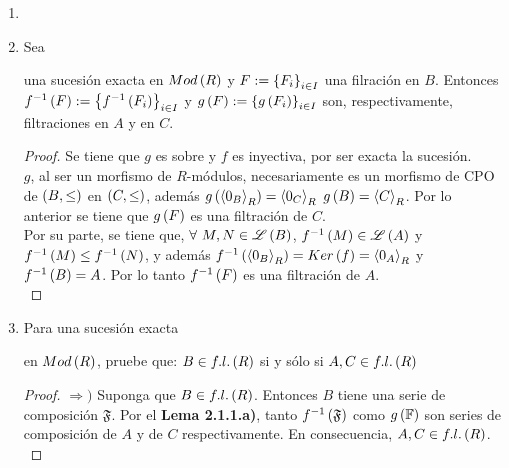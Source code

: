 \documentclass{article}
\begin{document}
\begin{enumerate}[label=\textbf{Ej \arabic*.}]
\begin{proof}
	$\boxed{\text{(b)}}$ Para este inciso suponga que $M$ es un $R$-módulo simple. En consecuencia, $L(M)=\{0,M\}$. Con lo cual, $M$ tiene una serie de composición $0=M_{0} \leq M_{1}=M$. De modo que $l\lrprth{M}=1$. Por otro lado, suponga que $l\lrprth{M}=1$, y sea $0=M_{0} \leq M_{1}=M$ una serie de composición para $M$. $\therefore M \cong M/0 \cong M_{1}/M_{0}$ es simple.
\end{proof}
\item 
\item Sea
\begin{center}
\end{center}
una sucesión exacta en $Mod\left(R\right)$ y $F:={\left\{{F}_{i}\right\}}_{i\in I}$ una filración en $B$. Entonces $f^{-1}\left(F\right):=\left\{f^{-1}\left(F_i\right)\right\}_{i\in I}$ y $g\left(F\right):=\left\{g\left(F_i\right)\right\}_{i\in I}$ son, respectivamente, filtraciones en $A$ y en $C$.
\begin{proof}
	Se tiene que $g$ es sobre y $f$ es inyectiva, por ser exacta la sucesión.\\
	$g$, al ser un morfismo de $R$-módulos, necesariamente es un morfismo de CPO de $\left(B,\leq\right)$ en $\left(C,\leq\right)$, además $g\left(\left< 0_B\right>_{R}\right)=\left< 0_C\right>_{R}$ $g\left(B\right)=\left< C\right>_{R}$. Por lo anterior se tiene que $g\left(F\right)$ es una filtración de $C$.\\
	Por su parte, se tiene  que, $\forall\ M,N\in\genlin{B}$,  $f^{-1}\left(M\right)\in\mathscr{L}\left(A\right)$ y $f^{-1}\left(M\right)\leq f^{-1}\left(N\right)$,  y además $f^{-1}\left(\left< 0_B\right>_{R}\right)=Ker\left(f\right)=\left< 0_A\right>_{R}$ y $f^{-1}\left(B\right)=A$. Por lo tanto $f^{-1}\left(F\right)$ es una filtración de $A$.\\
\end{proof}
\item %
Para una sucesión exacta
en $Mod\left(R\right)$, pruebe que: $B \in f.l.\left(R\right)$ si y sólo si $A,C \in f.l.\left(R\right)$
\begin{proof}
	$\boxed{\Rightarrow )}$ Suponga que $B \in f.l.\left(R\right)$. Entonces $B$ tiene una serie de composición $\mathfrak{F}$. Por el \textbf{Lema 2.1.1.a)}, tanto $f^{-1}\left(\mathfrak{F}\right)$ como $g\left(\mathbb{F}\right)$ son series de composición de $A$ y de $C$ respectivamente. En consecuencia, $A,C \in f.l.\left(R\right)$.\\
	

\end{proof}
\end{enumerate}
\end{document}
